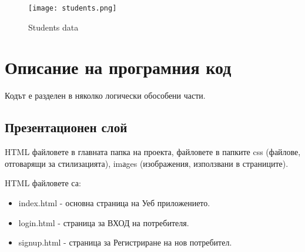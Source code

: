 \documentclass[12pt]{article}
\begin{document}
\begin{figure}[h!]
\centering
    \texttt{[image: students.png]}
  \caption{Students data}
\end{figure}
 
\section{Описание на програмния код}
Кодът е разделен в няколко логически обособени части. 

\subsection{Презентационен слой}
\noindent HTML файловете в главната папка на проекта, файловете в папките css (файлове, отговарящи за стилизацията), imаges (изображения, използвани в страниците).
\medskip

\noindent HTML файловете са:
\begin{itemize}
    \item index.html - основна страница на Уеб приложението.
    
    \item login.html - страница за ВХОД на потребителя.
    
    \item signup.html - страница за Регистриране на нов потребител.
\end{itemize}
\end{document}
